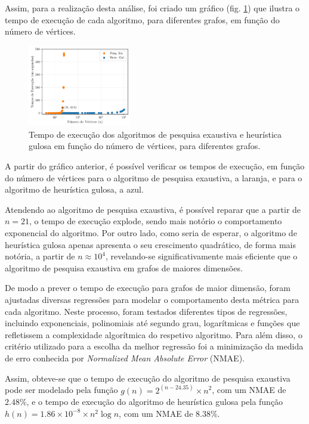 \documentclass[mirror]{revdetua}
\begin{document}
Assim, para a realização desta análise, foi criado um gráfico (fig. \ref{fig:exectime}) que ilustra o tempo de execução de cada algoritmo, para diferentes grafos, em função do número de vértices.

\begin{figure}[h]
    \centering
    \includegraphics[width=0.4\textwidth]{../assets/execTIME.png}
    \caption{Tempo de execução dos algoritmos de pesquisa exaustiva e heurística gulosa em função do número de vértices, para diferentes grafos.}
    \label{fig:exectime}
\end{figure}

A partir do gráfico anterior, é possível verificar os tempos de execução, em função do número de vértices para o algoritmo de pesquisa exaustiva, a laranja, e para o algoritmo de heurística gulosa, a azul. 

Atendendo ao algoritmo de pesquisa exaustiva, é possível reparar que a partir de $n = 21$, o tempo de execução explode, sendo mais notório o comportamento exponencial do algoritmo. Por outro lado, como seria de esperar, o algoritmo de heurística gulosa apenas apresenta o seu crescimento quadrático, de forma mais notória, a partir de $n \approx 10^4$, revelando-se significativamente mais eficiente que o algoritmo de pesquisa exaustiva em grafos de maiores dimensões.

De modo a prever o tempo de execução para grafos de maior dimensão, foram ajustadas diversas regressões para modelar o comportamento desta métrica para cada algoritmo. Neste processo, foram testados diferentes tipos de regressões, incluindo exponenciais, polinomiais até segundo grau, logarítmicas e funções que refletissem a complexidade algorítmica do respetivo algoritmo. Para além disso, o critério utilizado para a escolha da melhor regressão foi a minimização da medida de erro conhecida por \textit{Normalized Mean Absolute Error} (NMAE).

Assim, obteve-se que o tempo de execução do algoritmo de pesquisa exaustiva pode ser modelado pela função $g(n) = 2^{(n - 24.35)} \times n^2$, com um NMAE de $2.48\%$, e o tempo de execução do algoritmo de heurística gulosa pela função $h(n) = 1.86 \times 10^{-8} \times n^2 \log n$, com um NMAE de $8.38\%$.
\end{document}
